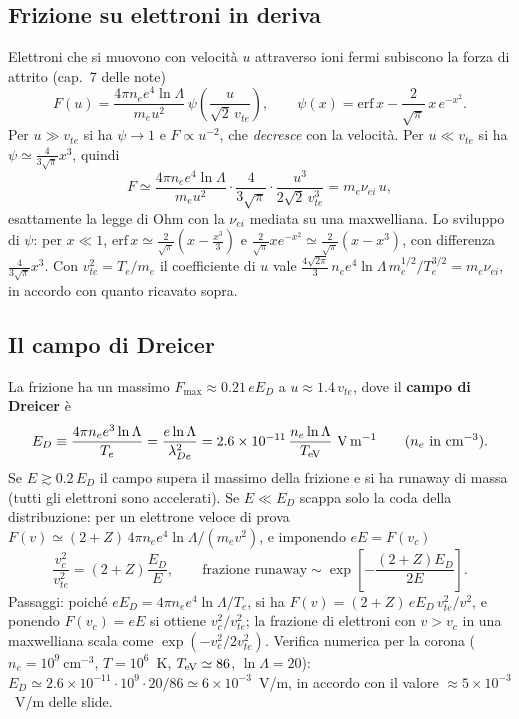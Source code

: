 \subsection{Frizione su elettroni in deriva}
Elettroni che si muovono con velocità $u$ attraverso ioni fermi subiscono la forza di attrito (cap.~7 delle note)
\begin{equation}
F(u)=\frac{4\pi n_ee^4\ln\Lambda}{m_eu^2}\,\psi\left(\frac{u}{\sqrt2\,v_{te}}\right),\qquad
\psi(x)=\mathrm{erf}\,x-\frac{2}{\sqrt\pi}\,x\,e^{-x^2}.
\end{equation}
Per $u\gg v_{te}$ si ha $\psi\to1$ e $F\propto u^{-2}$, che \textit{decresce} con la velocità. Per $u\ll v_{te}$ si ha $\psi\simeq\frac{4}{3\sqrt\pi}x^3$, quindi
\begin{equation}
F\simeq\frac{4\pi n_ee^4\ln\Lambda}{m_eu^2}\cdot\frac{4}{3\sqrt\pi}\cdot\frac{u^3}{2\sqrt2\,v_{te}^3}=m_e\nu_{ei}\,u,
\end{equation}
esattamente la legge di Ohm con la $\nu_{ei}$ mediata su una maxwelliana.
Lo sviluppo di $\psi$: per $x\ll1$, $\mathrm{erf}\,x\simeq\frac{2}{\sqrt\pi}\left(x-\frac{x^3}{3}\right)$ e $\frac{2}{\sqrt\pi}xe^{-x^2}\simeq\frac{2}{\sqrt\pi}(x-x^3)$, con differenza $\frac{4}{3\sqrt\pi}x^3$. Con $v_{te}^2=T_e/m_e$ il coefficiente di $u$ vale $\frac{4\sqrt{2\pi}}{3}\,n_ee^4\ln\Lambda\,m_e^{1/2}/T_e^{3/2}=m_e\nu_{ei}$, in accordo con quanto ricavato sopra.

\subsection{Il campo di Dreicer}
La frizione ha un massimo $F_{\max}\approx0.21\,eE_D$ a $u\approx1.4\,v_{te}$, dove il \textbf{campo di Dreicer} è
\begin{equation}
E_D\equiv\frac{4\pi n_ee^3\ln\Lambda}{T_e}=\frac{e\ln\Lambda}{\lambda_{De}^2}=2.6\times10^{-11}\,\frac{n_e\ln\Lambda}{T_{\rm eV}}\ \mathrm{V\,m^{-1}}\qquad(n_e\ \text{in}\ \mathrm{cm^{-3}}).
\end{equation}
Se $E\gtrsim0.2\,E_D$ il campo supera il massimo della frizione e si ha runaway di massa (tutti gli elettroni sono accelerati). Se $E\ll E_D$ scappa solo la coda della distribuzione: per un elettrone veloce di prova $F(v)\simeq(2+Z)\,4\pi n_ee^4\ln\Lambda/(m_ev^2)$, e imponendo $eE=F(v_c)$
\begin{equation}
\frac{v_c^2}{v_{te}^2}=(2+Z)\frac{E_D}{E},\qquad
\text{frazione runaway}\sim\exp\left[-\frac{(2+Z)E_D}{2E}\right].
\end{equation}
Passaggi: poiché $eE_D=4\pi n_ee^4\ln\Lambda/T_e$, si ha $F(v)=(2+Z)\,eE_D\,v_{te}^2/v^2$, e ponendo $F(v_c)=eE$ si ottiene $v_c^2/v_{te}^2$; la frazione di elettroni con $v>v_c$ in una maxwelliana scala come $\exp(-v_c^2/2v_{te}^2)$.
Verifica numerica per la corona ($n_e=10^9~\mathrm{cm^{-3}}$, $T=10^6$~K, $T_{\rm eV}\simeq86$, $\ln\Lambda=20$): $E_D\simeq2.6\times10^{-11}\cdot10^{9}\cdot20/86\simeq6\times10^{-3}$~V/m, in accordo con il valore $\approx5\times10^{-3}$~V/m delle slide.

